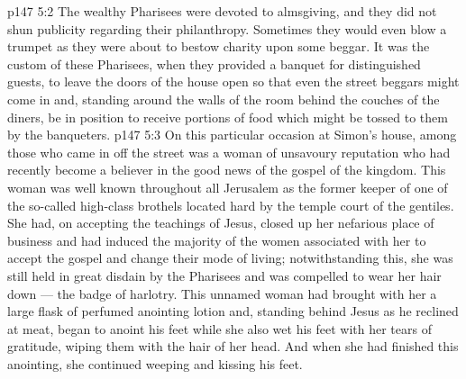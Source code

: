 \vs p147 5:2 The wealthy Pharisees were devoted to almsgiving, and they did not shun publicity regarding their philanthropy. Sometimes they would even blow a trumpet as they were about to bestow charity upon some beggar. It was the custom of these Pharisees, when they provided a banquet for distinguished guests, to leave the doors of the house open so that even the street beggars might come in and, standing around the walls of the room behind the couches of the diners, be in position to receive portions of food which might be tossed to them by the banqueters.
\vs p147 5:3 On this particular occasion at Simon’s house, among those who came in off the street was a woman of unsavoury reputation who had recently become a believer in the good news of the gospel of the kingdom. This woman was well known throughout all Jerusalem as the former keeper of one of the so\hyp{}called high\hyp{}class brothels located hard by the temple court of the gentiles. She had, on accepting the teachings of Jesus, closed up her nefarious place of business and had induced the majority of the women associated with her to accept the gospel and change their mode of living; notwithstanding this, she was still held in great disdain by the Pharisees and was compelled to wear her hair down --- the badge of harlotry. This unnamed woman had brought with her a large flask of perfumed anointing lotion and, standing behind Jesus as he reclined at meat, began to anoint his feet while she also wet his feet with her tears of gratitude, wiping them with the hair of her head. And when she had finished this anointing, she continued weeping and kissing his feet.
